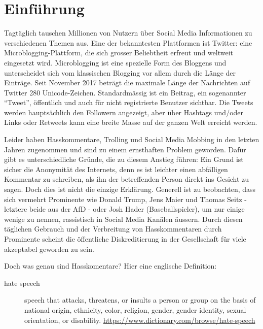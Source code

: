 \chapter{Einf\"uhrung}
\label{chap:introduction}
Tagt{\"a}glich tauschen Millionen von Nutzern {\"u}ber Social Media Informationen zu verschiedenen Themen aus. Eine der bekanntesten Plattformen ist Twitter: eine Microblogging-Plattform, die sich grosser Beliebtheit erfreut und weltweit eingesetzt wird. Microblogging ist eine spezielle Form des Bloggens und unterscheidet sich vom klassischen Blogging vor allem durch die L{\"a}nge der Eintr{\"a}ge. Seit November 2017 betr{\"a}gt die maximale L{\"a}nge der Nachrichten auf Twitter 280 Unicode-Zeichen. Standardm{\"a}ssig ist ein Beitrag, ein sogenannter ``Tweet'', {\"o}ffentlich und auch f{\"u}r nicht registrierte Benutzer sichtbar. Die Tweets werden haupts{\"a}chlich den Followern angezeigt, aber {\"u}ber Hashtags und/oder Links oder Retweets kann eine breite Masse auf der ganzen Welt erreicht werden.

Leider haben Hasskommentare, Trolling und Social Media Mobbing in den letzten Jahren zugenommen und sind zu einem ernsthaften Problem geworden. Daf{\"u}r gibt es unterschiedliche Gr{\"u}nde, die zu diesem Anstieg f{\"u}hren: Ein Grund ist sicher die Anonymit{\"a}t des Internets, denn es ist leichter einen abf{\"a}lligen Kommentar zu schreiben, als ihn der betreffenden Person direkt ins Gesicht zu sagen. Doch dies ist nicht die einzige Erkl{\"a}rung. Generell ist zu beobachten, dass sich vermehrt Prominente wie Donald Trump, Jens Maier und Thomas Seitz - letztere beide aus der AfD - oder Josh Hader (Baseballspieler), um nur einige wenige zu nennen, rassistisch in Social Media Kan{\"a}len {\"a}ussern. Durch diesen t{\"a}glichen Gebrauch und der Verbreitung von Hasskommentaren durch Prominente scheint die {\"o}ffentliche Diskreditierung in der Gesellschaft f{\"u}r viele akzeptabel geworden zu sein. 

Doch was genau sind Hasskomentare? Hier eine englische Definition: 
\begin{description}
\item[hate speech] speech that attacks, threatens, or insults a person or group on the basis of national origin, ethnicity, color, religion, gender, gender identity, sexual orientation, or disability.  \url{https://www.dictionary.com/browse/hate-speech}
\end{description}

